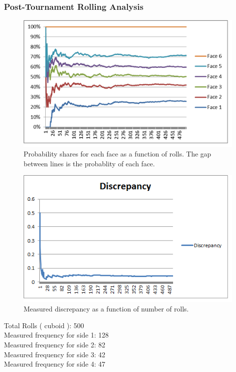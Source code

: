 \subsubsection{Post-Tournament Rolling Analysis}
\begin{figure}[h]
\center
\includegraphics[scale=1]{cuboid_graph.png}
\caption{Probability shares for each face as a function of rolls. The gap between lines is the probablity of each face.}
\label{fig:cuboid}
\end{figure}
\begin{figure}[h]
\center
\includegraphics[scale=1]{cuboid_di.png}
\caption{Measured discrepancy as a function of number of rolls.}
\label{fig:cuboid}
\end{figure}
Total Rolls ( cuboid ): 500\\
Measured frequency for side 1: 128\\
Measured frequency for side 2: 82\\
Measured frequency for side 3: 42\\
Measured frequency for side 4: 47\\
